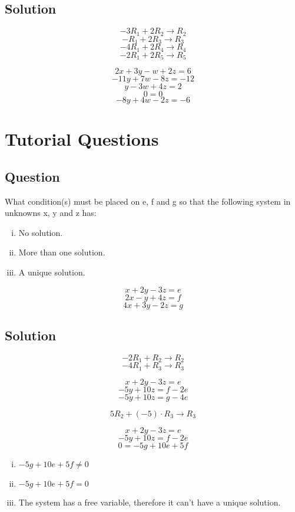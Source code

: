 \documentclass{book}
\begin{document}
\subsection*{Solution}

\[-3 R_1 + 2 R_2 \rightarrow R_2\]
\[- R_1 + 2 R_3 \rightarrow R_3\]
\[-4 R_1 + 2 R_4 \rightarrow R_4\]
\[-2 R_1 + 2 R_5 \rightarrow R_5\]

\[2x + 3y - w + 2z = 6\]
\[- 11y + 7w - 8z = - 12\]
\[y - 3w + 4z = 2\]
\[0 = 0\]
\[- 8y + 4w - 2z = - 6\]

\section{Tutorial Questions}

\subsection{Question}

What condition{(s)} must be placed on e, f and g so that the following system in unknowns x, y and z has:

\begin{enumerate}[i.]
	\item No solution.
	\item More than one solution.
	\item A unique solution.
\end{enumerate}

\[x + 2y - 3z = e\]
\[2x - y + 4z = f\]
\[4x + 3y - 2z = g\]

\subsection*{Solution}
\[-2 R_1 + R_2 \rightarrow R_2\]
\[-4 R_1 + R_3 \rightarrow R_3\]

\[x + 2y - 3z = e\]
\[-5y + 10z = f - 2e\]
\[-5y + 10z = g - 4e\]

\[5 R_2 + (-5) \cdot R_3 \rightarrow R_3\]

\[x + 2y - 3z = e\]
\[-5y + 10z = f - 2e\]
\[0 = -5g + 10e + 5f\]

\begin{enumerate}[i.]
	\item \(-5g + 10e + 5f \ne 0\)
	\item \(-5g + 10e + 5f = 0\)
	\item The system has a free variable, therefore it can't have a unique solution.
\end{enumerate}
\end{document}
